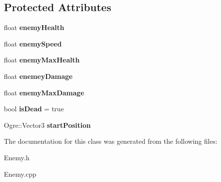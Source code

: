 \subsection*{Protected Attributes}
\begin{DoxyCompactItemize}
\item 
\hypertarget{class_enemy_ae8d1e783f756ee7abcd567278c6931fc}{}float {\bfseries enemy\+Health}\label{class_enemy_ae8d1e783f756ee7abcd567278c6931fc}

\item 
\hypertarget{class_enemy_a9b38a7895e8022b728bd3c1e789d1a75}{}float {\bfseries enemy\+Speed}\label{class_enemy_a9b38a7895e8022b728bd3c1e789d1a75}

\item 
\hypertarget{class_enemy_ac87d0129226b4fcabc8eb925557e4a34}{}float {\bfseries enemy\+Max\+Health}\label{class_enemy_ac87d0129226b4fcabc8eb925557e4a34}

\item 
\hypertarget{class_enemy_a552ba0a31a03f25e7c7dce73586d7419}{}float {\bfseries enemey\+Damage}\label{class_enemy_a552ba0a31a03f25e7c7dce73586d7419}

\item 
\hypertarget{class_enemy_a8d74f8ca995e4c4ccbf091a0956e891d}{}float {\bfseries enemy\+Max\+Damage}\label{class_enemy_a8d74f8ca995e4c4ccbf091a0956e891d}

\item 
\hypertarget{class_enemy_a6e55221aa524f0f826feadfd0c567b70}{}bool {\bfseries is\+Dead} = true\label{class_enemy_a6e55221aa524f0f826feadfd0c567b70}

\item 
\hypertarget{class_enemy_acbea8f82f287033c3110d2f10c343b5e}{}Ogre\+::\+Vector3 {\bfseries start\+Position}\label{class_enemy_acbea8f82f287033c3110d2f10c343b5e}

\end{DoxyCompactItemize}


The documentation for this class was generated from the following files\+:\begin{DoxyCompactItemize}
\item 
Enemy.\+h\item 
Enemy.\+cpp\end{DoxyCompactItemize}
